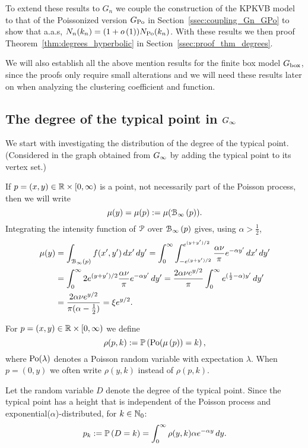 To extend these results to $G_n$ we couple the construction of the KPKVB model to that of the Poissonized version $G_{{\mathrm{Po}}}$ in Section~\ref{ssec:coupling_Gn_GPo} to show that a.a.s, $N_n(k_n) = (1+o\left(1\right)) N_{{\mathrm{Po}}}(k_n)$. With these results we then proof Theorem~\ref{thm:degrees_hyperbolic} in Section~\ref{ssec:proof_thm_degrees}.

We will also establish all the above mention results for the finite box model $G_{\mathrm{box}}$, since the proofs only require small alterations and we will need these results later on when analyzing the clustering coefficient and function.

\subsection{The degree of the typical point in $G_{\infty}$}\label{ssec:degrees_infinite_model}

We start with investigating the distribution of the degree of the typical point. (Considered in the graph obtained from $G_{\infty}$ by adding the typical point to its vertex set.)

If $p = (x,y) \in {\mathbb R}\times[0,\infty)$ is a point, not necessarily part of the Poisson process, then we will write
\[ 
	\mu(y) = \mu(p) := \mu({\mathcal B}_{\infty}\left(p\right)).
\]
Integrating the intensity function of ${\mathcal P}$ over ${\mathcal B}_{\infty}\left(p\right)$ gives, using $\alpha>\frac{1}{2}$,
\begin{align*}
	\mu(y) &= \int_{{\mathcal B}_{\infty}\left(p\right)} f(x',y') \, dx' \,d y'  
 		= \int_0^\infty \int_{-e^{(y+y')/2}}^{e^{(y+y')/2}} \frac{\alpha \nu}{\pi} e^{-\alpha y'} \, dx' \, dy' \\
	&= \int_0^\infty 2 e^{(y+y')/2} \frac{\alpha \nu}{\pi} e^{-\alpha y'} \, dy' 
 		= \frac{2\alpha \nu e^{y/2}}{\pi} \int_0^\infty e^{(\frac12-\alpha)y'} \, dy' \\
	&= \frac{2\alpha \nu e^{y/2}}{\pi(\alpha-\frac12)} = \xi e^{y/2}.
\end{align*} 

For $p = (x,y) \in {\mathbb R}\times[0,\infty)$ we define
\begin{equation}\label{eq:def_degree_inf_model}
	\rho(p,k) := \mathbb{P}\left({\mathrm{Po}}(\mu\left(p\right)) = k\right),
\end{equation}
where ${\mathrm{Po}}(\lambda)$ denotes a Poisson random variable with expectation $\lambda$. When $p = (0,y)$ we often write $\rho(y,k)$ instead of $\rho(p,k)$.

Let the random variable $D$ denote the degree of the typical point. Since the typical point has a height that is independent of the Poisson process and exponential($\alpha$)-distributed, for $k \in \mathbb{N}_0$:
\begin{equation}\label{eq:def_pk}
	p_k :=  \mathbb{P}\left(D = k\right) = \int_0^\infty \rho(y,k) \alpha e^{-\alpha y} \, dy.
\end{equation}

